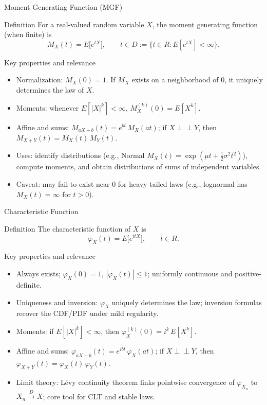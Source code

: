 \documentclass[aspectratio=43]{beamer}
\def\E{E}%
\def\mathbb#1{#1}%
\def\mathcal#1{#1}%
\newcommand{\R}{\mathbb{R}}
\newcommand{\E}{\mathbb{E}}
\newcommand{\1}{\mathbf{1}}
\newcommand{\indep}{\perp\!\!\!\perp}
\newcommand{\tod}{\xrightarrow{\,\mathcal{D}\,}}
\begin{document}
\begin{frame}{Moment Generating Function (MGF)}{}
  {\footnotesize
  \begin{block}{Definition}
    For a real-valued random variable $X$, the moment generating function (when finite) is
    \[
      M_X(t) = \E\big[e^{tX}\big], \qquad t\in D := \{t\in\R : \E[e^{tX}] < \infty\}.
    \]
  \end{block}
  \vspace{-0.35em}
  \begin{block}{Key properties and relevance}
    \begin{itemize}\setlength{\itemsep}{0.15em}
      \item Normalization: $M_X(0)=1$. If $M_X$ exists on a neighborhood of $0$, it uniquely determines the law of $X$.
      \item Moments: whenever $\E[|X|^k]<\infty$, $M_X^{(k)}(0)=\E[X^k]$.
      \item Affine and sums: $M_{aX+b}(t)=e^{bt}\,M_X(at)$; if $X\indep Y$, then $M_{X+Y}(t)=M_X(t)\,M_Y(t)$.
      \item Uses: identify distributions (e.g., Normal $M_X(t)=\exp(\mu t+\tfrac12\sigma^2 t^2)$), compute moments, and obtain distributions of sums of independent variables.
      \item Caveat: may fail to exist near $0$ for heavy-tailed laws (e.g., lognormal has $M_X(t)=\infty$ for $t>0$).
    \end{itemize}
  \end{block}
  }
\end{frame}

\begin{frame}{Characteristic Function}{}
  {\footnotesize
  \begin{block}{Definition}
    The characteristic function of $X$ is
    \[
      \varphi_X(t) = \E\big[e^{itX}\big], \qquad t\in\R.
    \]
  \end{block}
  \vspace{-0.35em}
  \begin{block}{Key properties and relevance}
    \begin{itemize}\setlength{\itemsep}{0.15em}
      \item Always exists; $\varphi_X(0)=1$, $|\varphi_X(t)|\le 1$; uniformly continuous and positive-definite.
      \item Uniqueness and inversion: $\varphi_X$ uniquely determines the law; inversion formulas recover the CDF/PDF under mild regularity.
      \item Moments: if $\E[|X|^k]<\infty$, then $\varphi_X^{(k)}(0)= i^k\,\E[X^k]$.
      \item Affine and sums: $\varphi_{aX+b}(t)= e^{ibt}\,\varphi_X(at)$; if $X\indep Y$, then $\varphi_{X+Y}(t)=\varphi_X(t)\,\varphi_Y(t)$.
      \item Limit theory: L\'evy continuity theorem links pointwise convergence of $\varphi_{X_n}$ to $X_n\tod X$; core tool for CLT and stable laws.
    \end{itemize}
  \end{block}
  }
\end{frame}
\end{document}
